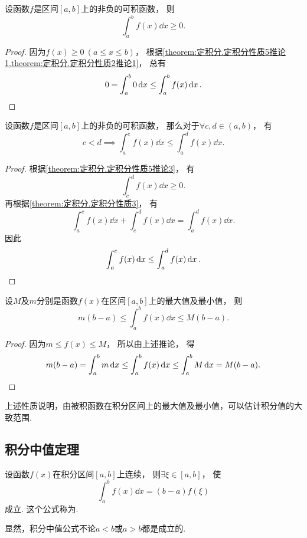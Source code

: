 \begin{corollary}\label{theorem:定积分.定积分性质5推论3}
设函数\(f\)是区间\([a,b]\)上的非负的可积函数，
则\[
	\int_a^b f(x) \dd{x} \geq 0.
\]
\begin{proof}
因为\(f(x)\geq0\ (a \leq x \leq b)\)，
根据\cref{theorem:定积分.定积分性质5推论1,theorem:定积分.定积分性质2推论1}，
总有\[
	0 = \int_a^b 0 \dd{x} \leq \int_a^b f(x) \dd{x}.
	\qedhere
\]
\end{proof}
\end{corollary}

\begin{corollary}\label{theorem:定积分.定积分性质5推论4}
设函数\(f\)是区间\([a,b]\)上的非负的可积函数，
那么对于\(\forall c,d\in(a,b)\)，
有\[
	c<d
	\implies
	\int_a^c f(x) \dd{x} \leq \int_a^d f(x) \dd{x}.
\]
\begin{proof}
根据\cref{theorem:定积分.定积分性质5推论3}，
有\[
	\int_c^d f(x) \dd{x} \geq 0.
\]
再根据\cref{theorem:定积分.定积分性质3}，
有\[
	\int_a^c f(x) \dd{x}
	+ \int_c^d f(x) \dd{x}
	= \int_a^d f(x) \dd{x}.
\]
因此\[
	\int_a^c f(x) \dd{x}
	\leq
	\int_a^d f(x) \dd{x}.
	\qedhere
\]
\end{proof}
\end{corollary}

\begin{property}\label{theorem:定积分.定积分性质6}
设\(M\)及\(m\)分别是函数\(f(x)\)在区间\([a,b]\)上的最大值及最小值，
则\[
	m(b-a) \leq \int_a^b f(x) \dd{x} \leq M(b-a).
\]
\begin{proof}
因为\(m \leq f(x) \leq M\)，
所以由上述推论，
得\[
	m(b-a)
	= \int_a^b m \dd{x}
	\leq \int_a^b f(x) \dd{x}
	\leq \int_a^b M \dd{x}
	= M(b-a).
	\qedhere
\]
\end{proof}
\end{property}
上述性质说明，由被积函数在积分区间上的最大值及最小值，可以估计积分值的大致范围.

\subsection{积分中值定理}
\begin{theorem}[定积分中值定理]\label{theorem:定积分.积分中值定理0}
设函数\(f(x)\)在积分区间\([a,b]\)上连续，
则\(\exists\xi\in[a,b]\)，
使\[
	\int_a^b f(x) \dd{x} = (b-a) f(\xi)
\]成立.
\rm
这个公式称为.
\end{theorem}
显然，积分中值公式不论\(a<b\)或\(a>b\)都是成立的.

